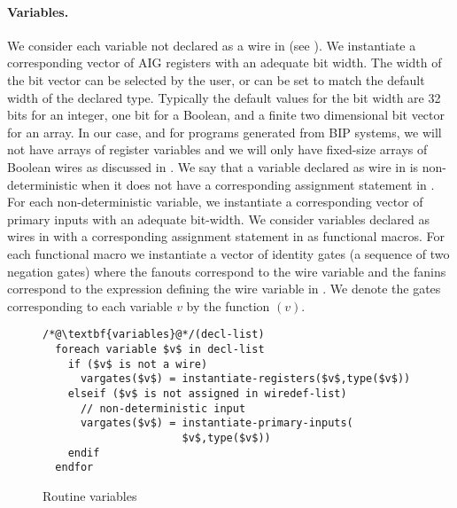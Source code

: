 \paragraph{Variables.} 
%
We consider each variable not declared as a wire 
in   (see ).
We instantiate a corresponding 
vector of AIG registers with an adequate bit width. 
The width of the bit vector can be selected by the user, 
or can be set to match the default width of the declared type. 
Typically the default values for the bit width are 
32 bits for an integer, one bit for a Boolean, and a 
finite two dimensional bit vector for an array. 
In our case, and for \caig programs generated from BIP systems, 
we will not have arrays of register variables
and we will only have fixed-size arrays of Boolean wires as 
discussed in .
%
We say that a variable declared as wire in 
is non-deterministic when it does not have a corresponding assignment statement in . 
For each non-deterministic variable, we instantiate a corresponding
vector of primary inputs with an adequate bit-width. 
%
We consider variables declared as wires in  with 
a corresponding assignment statement in  as functional macros. 
For each functional macro we 
instantiate a vector of identity gates (a sequence of two negation gates) 
where the fanouts correspond to the wire variable and the fanins correspond to
the expression defining the wire variable in . 
%
We denote the gates corresponding to each variable $v$ by the function $(v)$. 
%
\begin{figure}
\begin{lstlisting}
/*@\textbf{variables}@*/(decl-list)
  foreach variable $v$ in decl-list
    if ($v$ is not a wire) 
      vargates($v$) = instantiate-registers($v$,type($v$))
    elseif ($v$ is not assigned in wiredef-list) 
      // non-deterministic input
      vargates($v$) = instantiate-primary-inputs(
                      $v$,type($v$))
    endif
  endfor
\end{lstlisting}
\caption{Routine variables}
\label{fig:variables-listing}
\end{figure}
%
